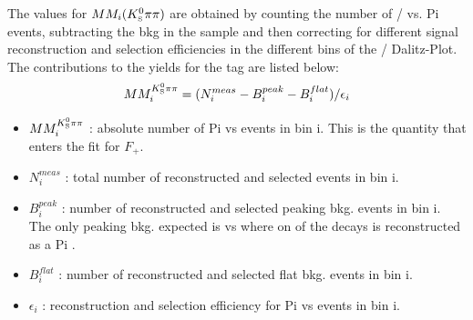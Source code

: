 The values for $MM_i({K^0_{\rm\scriptscriptstyle S}}{\pi}\pi)$ are obtained by counting the number of \KsPiPi / \KlPiPi vs. \4Pi events, subtracting the bkg in the sample and then correcting for different signal reconstruction and selection efficiencies in the different bins of the \KsPiPi / \KlPiPi Dalitz-Plot. The contributions to the yields for the \KsPiPi tag are listed below:
\begin{equation}
MM^{{K^0_{\rm\scriptscriptstyle S}}{\pi}\pi}_i = (N_i^{meas} - B_i^{peak} - B_i^{flat})/ \epsilon_i
\end{equation}
\begin{itemize}
\item $MM^{{K^0_{\rm\scriptscriptstyle S}}{\pi}\pi}_i$ : absolute number of \4Pi vs \KsPiPi events in bin i. This is the quantity that enters the fit for $F_+$.\\
\item $N_i^{meas}$ : total number of reconstructed and selected events in bin i. \\
\item $B_i^{peak}$ : number of reconstructed and selected peaking bkg. events in bin i. The only peaking bkg. expected is \KsPiPi vs \KsPiPi where on of the \KsPiPi decays is reconstructed as a \4Pi . \\
\item $B_i^{flat}$ : number of reconstructed and selected flat bkg. events in bin i.\\
\item $\epsilon_i$ : reconstruction and selection efficiency for \4Pi vs \KsPiPi events in bin i. \\
\end{itemize}

